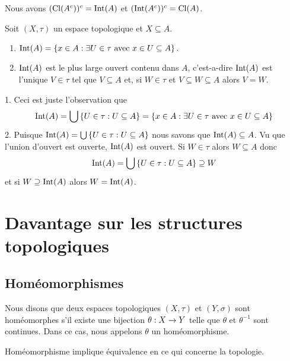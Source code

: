 \documentclass[french]{article}
\begin{document}
\begin{lemme}
  Nous avons $(\mathrm{Cl}(A^{c}))^{c} = \mathrm{Int}(A)$ et $(\mathrm{Int}(A^{c}))^{c} = \mathrm{Cl}(A)$.
\end{lemme}

\begin{lemme}
  Soit $(X, \tau)$ un espace topologique et $X \subseteq A$.
  \begin{enumerate}
    \item $\mathrm{Int}(A) = \left\{ x \in A : \exists U \in \tau \text{ avec } x \in U \subseteq A \right\}.$ 
    \item $\mathrm{Int}(A)$ est le plus large ouvert contenu dans $A$, c'est-a-dire $\mathrm{Int}(A)$ est l'unique $V \in \tau$ tel que $V \subseteq A$ et, si $W \in \tau$ et $V \subseteq W \subseteq A$ alors $V = W$.
  \end{enumerate}

  \tcblower
  \begin{preuve}
    1. Ceci est juste l'observation que
    $$\mathrm{Int}(A) = \bigcup \left\{ U \in \tau : U \subseteq A \right\} =\left\{ x \in A : \exists U \in \tau \text{ avec } x \in U \subseteq A \right\} $$
    2. Puisque $\mathrm{Int}(A) = \bigcup \left\{ U \in \tau : U \subseteq A \right\}$ nous savons que $\mathrm{Int}(A) \subseteq A$. Vu que l'union d'ouvert est ouverte, $\mathrm{Int}(A)$ est ouvert.
    \newline Si $W \in \tau$ alors $W \subseteq A$ donc
    $$\mathrm{Int}(A) = \bigcup \left\{ U \in \tau : U \subseteq A \right\} \supseteq W$$
    et si $W \supseteq \mathrm{Int}(A)$ alors $W = \mathrm{Int}(A)$.
  \end{preuve}  
\end{lemme}

\section{Davantage sur les structures topologiques}
\subsection{Homéomorphismes}

\begin{definition}
  Nous disons que deux espaces topologiques $(X, \tau)$ et $(Y, \sigma)$ sont homéomorphes s'il existe une bijection $\theta: X \rightarrow Y$ telle que $\theta$ et $\theta^{-1}$ sont continues. Dans ce cas, nous appelons $\theta$ un homéomorphisme.
\end{definition}
\begin{remarque}
  Homéomorphisme implique équivalence en ce qui concerne la topologie.
\end{remarque}
\end{document}
